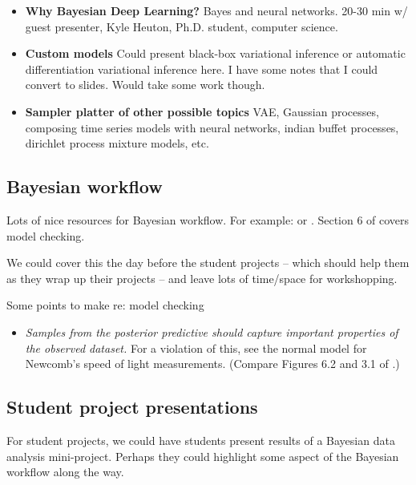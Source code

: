 \documentclass{article} %
\begin{document}
\begin{itemize}
\item \textbf{Why Bayesian Deep Learning?}  Bayes and neural networks.   20-30 min w/ guest presenter,  Kyle Heuton,  Ph.D.  student,  computer science.
\item \textbf{Custom models}  Could present black-box variational inference or automatic differentiation variational inference here.   I have some notes that I could convert to slides.  Would take some work though.  
\item \textbf{Sampler platter of other possible topics}   VAE,   Gaussian processes,  composing time series models with neural networks,  indian buffet processes,  dirichlet process mixture models,  etc.  
\end{itemize}

\subsection{Bayesian workflow}  \label{sec:Bayesian workflow}


Lots of nice resources for Bayesian workflow.    For example: \cite{gelman2020bayesian} or \cite{gabry2019visualization}.   Section 6 of \cite{gelman2013bayesian} covers model checking.       

We could cover this the day before the student projects -- which should help them as they wrap up their projects -- and leave lots of time/space for workshopping. 

Some points to make re: model checking

\begin{itemize}
\item \textit{Samples from the posterior predictive should capture important properties of the observed dataset.}  For a violation of this,  see the normal model for Newcomb's speed of light measurements.  (Compare Figures 6.2 and 3.1 of \cite{gelman2013bayesian}.)
\end{itemize}

\subsection{Student project presentations}

For student projects,  we could have students present results of a Bayesian data analysis mini-project.   Perhaps they could highlight some aspect of the Bayesian workflow along the way. 
\end{document}
